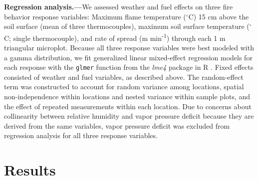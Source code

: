 \documentclass[referee, 
		     sn-basic]{sn-jnl}
\newcommand{\degC}{$^\circ$C}
\begin{document}
\begin{linenumbers}
\textbf{Regression analysis.---}We assessed weather and fuel effects on three fire behavior response variables: Maximum flame temperature (\degC) 15 cm above the soil surface (mean of three thermocouples), maximum soil surface temperature (\degC; single thermocouple), and rate of spread (m min\textsuperscript{-1}) through each 1 m triangular microplot. 
Because all three response variables were best modeled with a gamma distribution, we fit generalized linear mixed-effect regression models for each response with the \texttt{glmer} function from the \emph{lme4} package in \textsf{R} \citep{bates2015}. 
Fixed effects consisted of weather and fuel variables, as described above. 
The
random-effect term was constructed to account for random variance among
locations, spatial non-independence within locations and nested variance
within sample plots, and the effect of repeated measurements within each
location. Due to concerns about collinearity between relative humidity
and vapor pressure deficit because they are derived from the same
variables, vapor pressure deficit was excluded from regression analysis
for all three response variables.

\hypertarget{results}{%
\section{Results}\label{results}}


\end{linenumbers}
\end{document}
